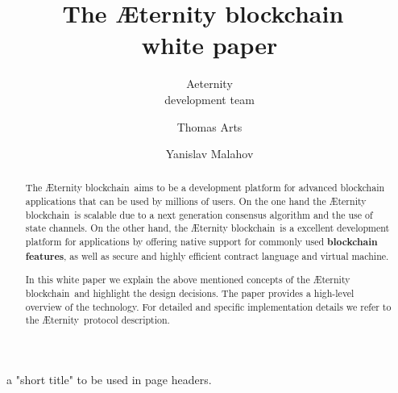 \documentclass{article}
\newcommand{\blockchain}{{\AE}ternity blockchain}
\newcommand{\aet}{{\AE}ternity}
\begin{document}
%
a "short title" to be used in page headers.
\title{The \blockchain\ \\white paper}

\author{Aeternity\\development team  \and Thomas Arts \and
             Yanislav Malahov}

\maketitle

%
\begin{abstract}
The \blockchain\ aims to be a development platform for advanced blockchain
applications that can be used by millions of users.
On the one hand the \blockchain\ is scalable due to a next generation
consensus algorithm and the use of state channels. On the other hand,
the \blockchain\ is a excellent development platform for
applications by offering native support for commonly used
\textbf{blockchain features}, as well as secure and highly efficient
contract language and virtual machine.

In this white paper we explain the above mentioned concepts of the
\blockchain\ and highlight the design decisions. The
paper provides a high-level overview of the technology. For detailed
and specific implementation details we refer to the \aet\ protocol
description.

\end{abstract}










%

 
\end{document}
